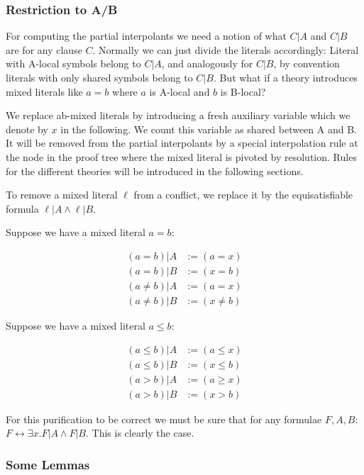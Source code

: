\documentclass{llncs}
\begin{document}
\subsubsection{Restriction to A/B}

For computing the partial interpolants we need a notion of what $C|A$ and $C|B$ 
are for any clause $C$. Normally we can just divide the literals accordingly: 
Literal with A-local symbols belong to $C|A$, and analogously for $C|B$, by 
convention literals with only shared symbols belong to $C|B$. But what if a 
theory introduces mixed literals like $a=b$ where $a$ is A-local and $b$ is 
B-local?

We replace ab-mixed literals by introducing a fresh auxiliary variable which we 
denote by $x$ in the following. We count this variable as shared between A and B. 
It will be removed from the partial interpolants by a special interpolation rule
at the node in the proof tree where the mixed literal is pivoted by resolution. 
Rules for the different theories will be introduced in the following sections.

To remove a mixed literal $\ell$ from a conflict, we replace it by the 
equisatisfiable formula $\ell|A \wedge \ell|B$.

Suppose we have a mixed literal $a=b$:

\begin{align*}
(a=b)|A & := (a=x) \\
(a=b)|B & := (x=b) \\
(a\neq b)|A & := (a=x) \\
(a\neq b)|B & := (x\neq b)
\end{align*}

Suppose we have a mixed literal $a\leq b$:

\begin{align*}
(a\leq b)|A & := (a\leq x) \\
(a\leq b)|B & := (x\leq b) \\
(a > b)|A & := (a\geq x) \\
(a > b)|B & := (x > b)
\end{align*}

For this purification to be correct we must be sure that for any formulae $F,A,B$: 
$F \leftrightarrow \exists x. F|A \wedge F|B$. This is clearly the case.

\subsubsection{Some Lemmas}
\end{document}
